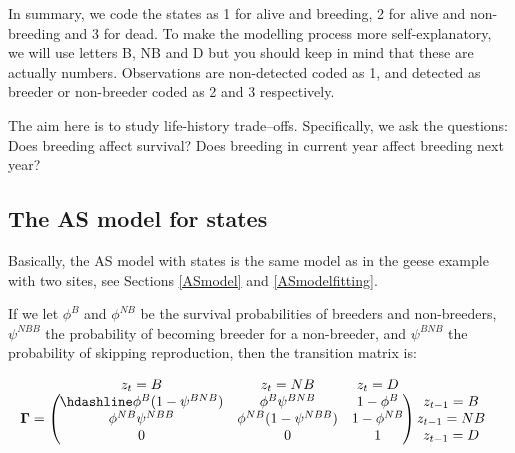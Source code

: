 \documentclass[
  12pt,
]{krantz}
\begin{document}
In summary, we code the states as 1 for alive and breeding, 2 for alive and non-breeding and 3 for dead. To make the modelling process more self-explanatory, we will use letters B, NB and D but you should keep in mind that these are actually numbers. Observations are non-detected coded as 1, and detected as breeder or non-breeder coded as 2 and 3 respectively.

The aim here is to study life-history trade--offs. Specifically, we ask the questions: Does breeding affect survival? Does breeding in current year affect breeding next year?

\subsection{The AS model for states}\label{the-as-model-for-states}

Basically, the AS model with states is the same model as in the geese example with two sites, see Sections \ref{ASmodel} and \ref{ASmodelfitting}.

If we let \(\phi^B\) and \(\phi^{NB}\) be the survival probabilities of breeders and non-breeders, \(\psi^{NBB}\) the probability of becoming breeder for a non-breeder, and \(\psi^{BNB}\) the probability of skipping reproduction, then the transition matrix is:

\[\begin{matrix}
& \\
\mathbf{\Gamma} =
    \left ( \vphantom{ \begin{matrix} 12 \\ 12 \\ 12 \end{matrix} } \right .
\end{matrix}
\hspace{-1.2em}
\begin{matrix}
    z_t=B & z_t=NB & z_t=D \\ \hdashline
\phi^B (1-\psi^{BNB}) & \phi^B \psi^{BNB} & 1 - \phi^B\\
\phi^{NB} \psi^{NBB} & \phi^{NB} (1-\psi^{NBB}) & 1 - \phi^{NB}\\
0 & 0 & 1
\end{matrix}
\hspace{-0.2em}
\begin{matrix}
& \\
\left . \vphantom{ \begin{matrix} 12 \\ 12 \\ 12 \end{matrix} } \right )
    \begin{matrix}
    z_{t-1}=B \\ z_{t-1}=NB \\ z_{t-1}=D
    \end{matrix}
\end{matrix}\]
\end{document}
